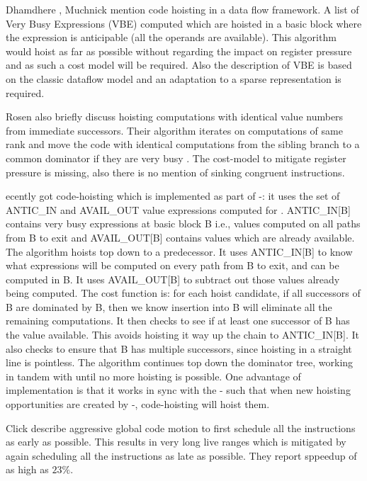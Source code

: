 \documentclass[acmlarge,review]{acmart}\settopmatter{printfolios=true}
\begin{document}
Dhamdhere \cite{dhamdhere1988fast}, Muchnick \cite{steven1997advanced} mention
code hoisting in a data flow framework. A list of Very Busy Expressions (VBE)
computed which are hoisted in a basic block where the expression is
anticipable (all the operands are available). This algorithm would hoist as far
as possible without regarding the impact on register pressure and as such a cost
model will be required.  Also the description of VBE is based on the classic
dataflow model and an adaptation to a sparse \SSA{} representation is required.

Rosen \cite{rosen1988global} also briefly discuss hoisting computations with
identical value numbers from immediate successors. Their algorithm iterates on
computations of same rank and move the code with identical computations from the
sibling branch to a common dominator if they are very busy
\cite{steven1997advanced}. The cost-model to mitigate register pressure is
missing, also there is no mention of sinking congruent instructions.

\GCC{}ecently got code-hoisting \cite{GCCCodeHoisting} which is implemented as
part of \GVN{}-\PRE{}: it uses the set of ANTIC\_IN and AVAIL\_OUT value
expressions computed for \PRE{}. ANTIC\_IN[B] contains very busy expressions at
basic block B i.e., values computed on all paths from B to exit and
AVAIL\_OUT[B] contains values which are already available. The algorithm hoists
top down to a predecessor.  It uses ANTIC\_IN[B] to know what expressions will
be computed on every path from B to exit, and can be computed in B.  It uses
AVAIL\_OUT[B] to subtract out those values already being computed.  The cost
function is: for each hoist candidate, if all successors of B are dominated by
B, then we know insertion into B will eliminate all the remaining computations.
It then checks to see if at least one successor of B has the value available.
This avoids hoisting it way up the chain to ANTIC\_IN[B].  It also checks to
ensure that B has multiple successors, since hoisting in a straight line is
pointless.  The algorithm continues top down the dominator tree, working in
tandem with \PRE{} until no more hoisting is possible.  One advantage of \GCC{}
implementation is that it works in sync with the \GVN{}-\PRE{} such that when
new hoisting opportunities are created by \GVN{}-\PRE{}, code-hoisting will
hoist them.

Click \cite{click1995global} describe aggressive global code motion to first
schedule all the instructions as early as possible. This results in very long
live ranges which is mitigated by again scheduling all the instructions as late
as possible. They report sppeedup of as high as $23\%$.
\end{document}
